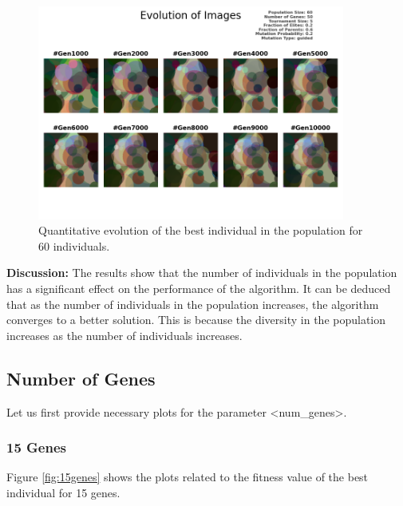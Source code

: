 \documentclass{assignment}
\begin{document}
\begin{figure}[!htb]
    \centering
    \includegraphics[width=0.9\textwidth]{figures/images_output_60_50_5_0.2_0.6_0.2_guided.png}
    \caption{Quantitative evolution of the best individual in the population for 60 individuals.}
    \label{fig:60inds_image}
\end{figure}

\textbf{Discussion:} The results show that the number of individuals in the population has a significant effect on the performance of the algorithm. It can be deduced that as the number of individuals in the population increases, the algorithm converges to a better solution. This is because the diversity in the population increases as the number of individuals increases.

\subsection{Number of Genes}
Let us first provide necessary plots for the parameter \textless{}num\_genes\textgreater{}.
\subsubsection{15 Genes}
Figure \ref{fig:15genes} shows the plots related to the fitness value of the best individual for 15 genes.
\end{document}
